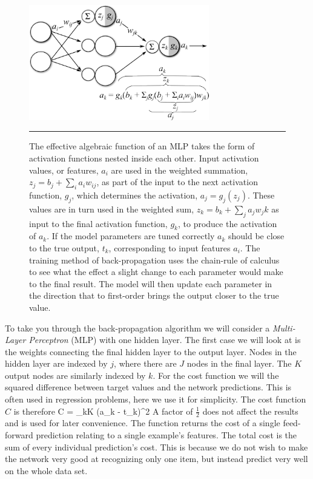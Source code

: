 \begin{figure}[htbp]
	\centering
		\includegraphics[width = 0.7\textwidth]{./Figures/neural_net.png}
		\rule{35em}{0.5pt}
	\caption[MLP Notation]{The effective algebraic function of an MLP takes the form of activation functions nested inside each other. Input activation values, or features, $a_i$ are used in the weighted summation, $z_j = b_j + \sum_i a_i w_{ij}$, as part of the input to the next activation function, $g_j$, which determines the activation, $a_j = g_j(z_j)$. These values are in turn used in the weighted sum, $z_k = b_k + \sum_j a_j w_jk$ as input to the final activation function, $g_k$, to produce the activation of $a_k$. If the model parameters are tuned correctly $a_k$ should be close to the true output, $t_k$, corresponding to input features $a_i$. The training method of back-propagation uses the chain-rule of calculus to see what the effect a slight change to each parameter would make to the final result. The model will then update each parameter in the direction that to first-order brings the output closer to the true value\citep{backpropagationImage}.}
	\label{fig:MLP_2}
\end{figure}

To take you through the back-propagation algorithm we will consider a \textit{Multi-Layer Perceptron} (MLP) with one hidden layer.
The first case we will look at is the weights connecting the final hidden layer to the output layer.
Nodes in the hidden layer are indexed by $j$, where there are $J$ nodes in the final layer.
The $K$ output nodes are similarly indexed by $k$.
For the cost function we will the squared difference between target values and the network predictions.
This is often used in regression problems, here we use it for simplicity.
The cost function $C$ is therefore
\be
C = \sum_{k\epsilon K} (a_k - t_k)^2
\ee
A factor of $\frac{1}{2}$ does not affect the results and is used for later convenience.
The function returns the cost of a single feed-forward prediction relating to a single example's features.
The total cost is the sum of every individual prediction's cost.
This is because we do not wish to make the network very good at recognizing only one item, but instead predict very well on the whole data set.

